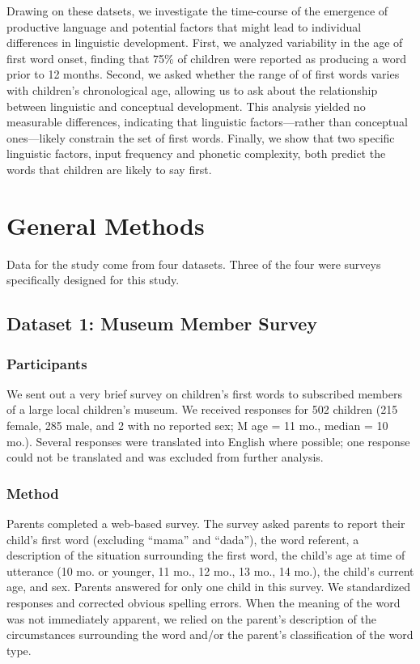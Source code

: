 \documentclass[10pt,letterpaper]{article}
\begin{document}
Drawing on these datsets, we investigate the time-course of the emergence of productive language and potential factors that might lead to individual differences in linguistic development. First, we analyzed variability in the age of first word onset, finding that 75\% of children were reported as producing a word prior to 12 months. Second, we asked whether the range of of first words varies with children's chronological age, allowing us to ask about the relationship between linguistic and conceptual development. This analysis yielded no measurable differences, indicating that linguistic factors---rather than conceptual ones---likely constrain the set of first words. Finally, we show that two specific linguistic factors, input frequency and phonetic complexity, both predict the words that children are likely to say first.

\section{General Methods}

Data for the study come from four datasets. Three of the four were surveys specifically designed for this study. 

\subsection{Dataset 1: Museum Member Survey}

\subsubsection{Participants}

We sent out a very brief survey on children's first words to subscribed members of a large local children's museum. We received responses for 502 children (215 female, 285 male, and 2 with no reported sex; M age = 11 mo., median = 10 mo.). Several responses were translated into English where possible; one response could not be translated and was excluded from further analysis. 

\subsubsection{Method}

Parents completed a web-based survey. The survey asked parents to report their child's first word (excluding ``mama'' and ``dada''), the word referent, a description of the situation surrounding the first word, the child's age at time of utterance (10 mo. or younger, 11 mo., 12 mo., 13 mo., 14 mo.), the child's current age, and sex. Parents answered for only one child in this survey. We standardized responses and corrected obvious spelling errors. When the meaning of the word was not immediately apparent, we relied on the parent's description of the circumstances surrounding the word and/or the parent's classification of the word type.
\end{document}
